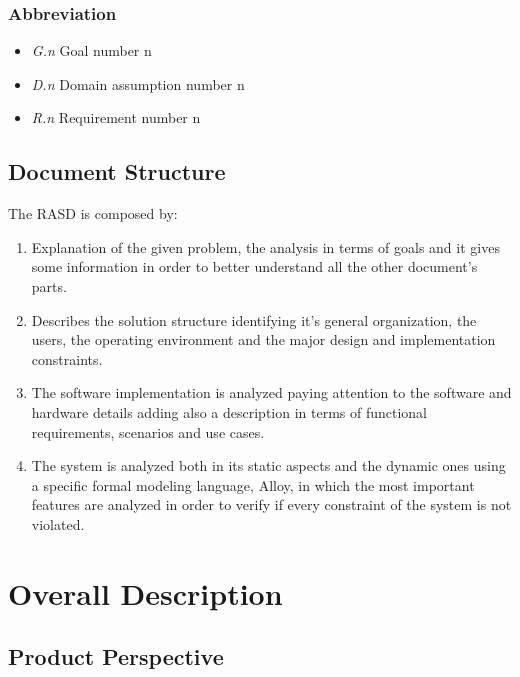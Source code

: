 \documentclass[a4paper]{article}
\begin{document}
    \subsubsection{Abbreviation}
        \begin{itemize}
        \item \textit{G.n} Goal number n
        \item \textit{D.n} Domain assumption number n
        \item \textit{R.n} Requirement number n
    \end{itemize}

\subsection{Document Structure}
The RASD is composed by:
\begin{enumerate}
    \item Explanation of the given problem, the analysis in terms of goals and it gives some information in order to better understand all the other document's parts.
    \item Describes the solution structure identifying it's general organization, the users, the operating environment and the major design and implementation constraints.
    \item The software implementation is analyzed paying attention to the software and hardware details adding also a description in terms of functional requirements, scenarios and use cases.
    \item The system is analyzed both in its static aspects and the dynamic ones using a specific formal modeling language, Alloy, in which the most important features are analyzed in order to verify if every constraint of the system is not violated.
\end{enumerate}

\section{Overall Description}

\subsection{Product Perspective}
\end{document}
